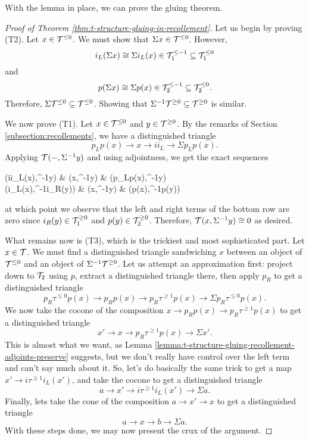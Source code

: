 With the lemma in place, we can prove the gluing theorem.

\begin{proof}[Proof of Theorem \ref{thm:t-structure-gluing-in-recollement}]
Let us begin by proving (T2). Let \(x\in\mathcal{T}^{\leq 0}\). We must show that \(\Sigma x \in\mathcal{T}^{\leq 0}\). However,
\[ i_L(\Sigma x) \cong \Sigma i_L(x) \in \mathcal{T}_1^{\leq -1} \subseteq \mathcal{T}_1^{\leq 0} \]
and
\[ p(\Sigma x) \cong \Sigma p(x) \in \mathcal{T}_2^{\leq -1} \subseteq \mathcal{T}_2^{\leq 0}. \]
Therefore, \(\Sigma\mathcal{T}^{\leq 0}\subseteq\mathcal{T}^{\leq 0}\). Showing that \(\Sigma^{-1}\mathcal{T}^{\geq 0}\subseteq\mathcal{T}^{\geq 0}\) is similar.

We now prove (T1). Let \(x\in\mathcal{T}^{\leq 0}\) and \(y\in\mathcal{T}^{\geq 0}\). By the remarks of Section \ref{subsection:recollements}, we have a distinguished triangle
\[ p_Lp(x) \to x \to ii_L \to \Sigma p_Lp(x). \]
Applying \(\mathcal{T}(-,\Sigma^{-1}y)\) and using adjointness, we get the exact sequences
\begin{diagram*}[cramped]
	\calT(ii_L(x),\Sigma^{-1}y)  \ar[r] & \calT(x,\Sigma^{-1}y) \ar[d,equal] \ar[r] & \calT(p_Lp(x),\Sigma^{-1}y)  \\
	\calT(i_L(x),\Sigma^{-1}i_R(y)) \ar[r] & \calT(x,\Sigma^{-1}y) \ar[r] & \calT(p(x),\Sigma^{-1}p(y))
\end{diagram*}
at which point we observe that the left and right terms of the bottom row are zero since \(i_R(y)\in\mathcal{T}_1^{\geq 0}\) and \(p(y)\in\mathcal{T}_2^{\geq 0}\). Therefore,
\(\mathcal{T}(x,\Sigma^{-1}y)\cong 0\) as desired.

What remains now is (T3), which is the trickiest and most sophisticated part. Let \(x\in\mathcal{T}\). We must find a distinguished triangle sandwiching \(x\)
between an object of \(\mathcal{T}^{\leq 0}\) and an object of \(\Sigma^{-1}\mathcal{T}^{\geq 0}\). Let us attempt an approximation first: project down to \(\mathcal{T}_2\) using \(p\),
extract a distinguished triangle there, then apply \(p_R\) to get a distinguished triangle
\[ p_R\tau^{\leq 0}p(x) \to p_Rp(x) \to p_R\tau^{\geq 1}p(x) \to \Sigma p_R\tau^{\leq 0}p(x). \]
We now take the cocone of the composition \(x \to p_Rp(x) \to p_R\tau^{\geq 1}p(x)\) to get a distinguished triangle
\[ x' \to x \to p_R\tau^{\geq 1}p(x) \to \Sigma x'. \]
This is almost what we want, as Lemma \ref{lemma:t-structure-gluing-recollement-adjoints-preserve} suggests, but we don't really have control over the left term and can't say much about it. So, let's do basically the same trick
to get a map \(x' \to i\tau^{\geq 1}i_L(x')\), and take the cocone to get a distinguished triangle
\[ a \to x' \to i\tau^{\geq 1}i_L(x') \to \Sigma a. \]
Finally, lets take the cone of the composition \(a \to x' \to x\) to get a distinguished triangle
\[ a \to x \to b \to \Sigma a. \]
With these steps done, we may now present the crux of the argument.


\end{proof}
